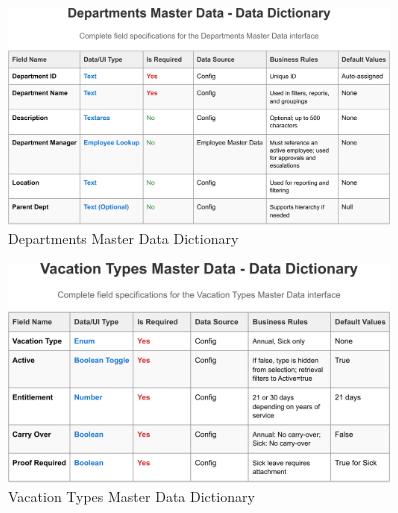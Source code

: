 \documentclass[12pt,a4paper]{article}
\begin{document}
\begin{figure}[H]
\centering
\includegraphics[width=0.9\textwidth]{Data-Dictionary/Master-Data-Dictionaries/Departments-Master-Data-Data-Dictionary/Departments-Master-Data-Data-Dictionary-1.png}
\caption{Departments Master Data Dictionary}
\label{fig:departments-master-data}
\end{figure}

\begin{figure}[H]
\centering
\includegraphics[width=0.9\textwidth]{Data-Dictionary/Master-Data-Dictionaries/Vacation-Types-Master-Data-Data-Dictionary/Vacation-Types-Master-Data-Data-Dictionary-1.png}
\caption{Vacation Types Master Data Dictionary}
\label{fig:vacation-types-master-data}
\end{figure}
\end{document}
